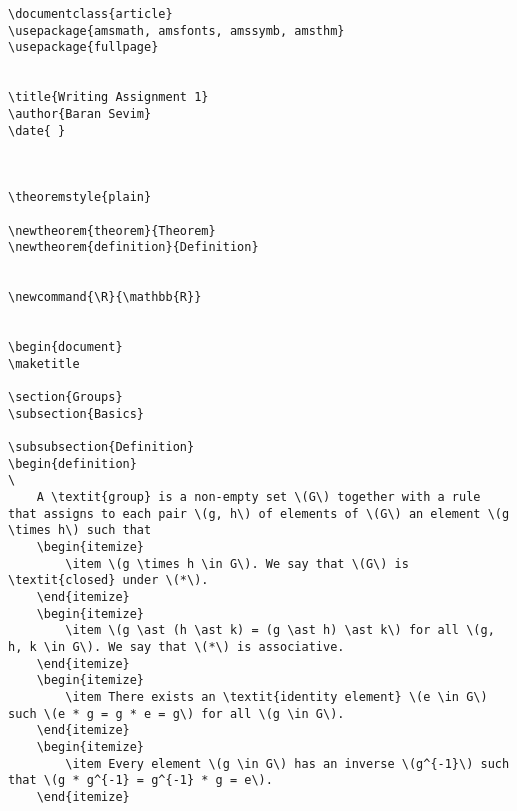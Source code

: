 \documentclass{article}
\theoremstyle{plain}
\newtheorem{definition}{Definition}
\newcommand{\R}{\mathbb{R}}
\begin{document}
\begin{verbatim}
\documentclass{article}
\usepackage{amsmath, amsfonts, amssymb, amsthm}
\usepackage{fullpage}


\title{Writing Assignment 1}
\author{Baran Sevim}
\date{ }



\theoremstyle{plain}

\newtheorem{theorem}{Theorem}
\newtheorem{definition}{Definition}


\newcommand{\R}{\mathbb{R}}


\begin{document}
\maketitle

\section{Groups}
\subsection{Basics}

\subsubsection{Definition}
\begin{definition}
\
    A \textit{group} is a non-empty set \(G\) together with a rule that assigns to each pair \(g, h\) of elements of \(G\) an element \(g \times h\) such that 
    \begin{itemize}
        \item \(g \times h \in G\). We say that \(G\) is \textit{closed} under \(*\).
    \end{itemize}
    \begin{itemize}
        \item \(g \ast (h \ast k) = (g \ast h) \ast k\) for all \(g, h, k \in G\). We say that \(*\) is associative.
    \end{itemize}
    \begin{itemize}
        \item There exists an \textit{identity element} \(e \in G\) such \(e * g = g * e = g\) for all \(g \in G\).
    \end{itemize}
    \begin{itemize}
        \item Every element \(g \in G\) has an inverse \(g^{-1}\) such that \(g * g^{-1} = g^{-1} * g = e\).
    \end{itemize}
    

\end{verbatim}
\end{document}
